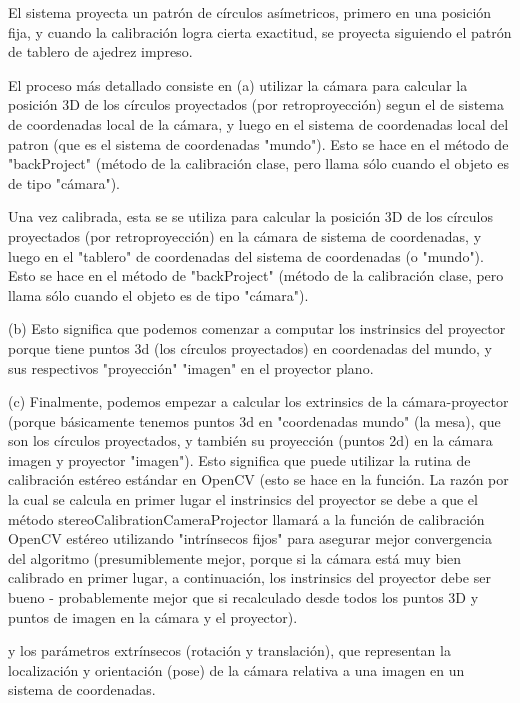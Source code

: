 El sistema proyecta un patrón de círculos asímetricos, primero en una posición fija, y cuando la calibración logra cierta exactitud, se proyecta siguiendo el patrón de tablero de ajedrez impreso. 

El proceso más detallado consiste en (a) utilizar la cámara para calcular la posición 3D de los círculos proyectados (por retroproyección) segun el  de sistema de coordenadas local de la cámara, y luego en el sistema de coordenadas local del patron (que es el sistema de coordenadas "mundo"). Esto se hace en el método de "backProject" (método de la calibración clase, pero llama sólo cuando el objeto es de tipo "cámara"). 

Una vez calibrada, esta se se utiliza para calcular la posición 3D de los círculos proyectados (por retroproyección) en la cámara de sistema de coordenadas, y luego en el "tablero" de coordenadas del sistema de coordenadas (o "mundo"). Esto se hace en el método de "backProject" (método de la calibración clase, pero llama sólo cuando el objeto es de tipo "cámara"). 

(b) Esto significa que podemos comenzar a computar los instrinsics del proyector porque tiene puntos 3d (los círculos proyectados) en coordenadas del mundo, y sus respectivos "proyección" "imagen" en el proyector plano. 

(c) Finalmente, podemos empezar a calcular los extrinsics de la cámara-proyector (porque básicamente tenemos puntos 3d en "coordenadas mundo" (la mesa), que son los círculos proyectados, y también su proyección (puntos 2d) en la cámara imagen y proyector "imagen"). Esto significa que puede utilizar la rutina de calibración estéreo estándar en OpenCV (esto se hace en la función. La razón por la cual se calcula en primer lugar el instrinsics del proyector se debe a que el método stereoCalibrationCameraProjector llamará a la función de calibración OpenCV estéreo utilizando "intrínsecos fijos" para asegurar mejor convergencia del algoritmo (presumiblemente mejor, porque si la cámara está muy bien calibrado en primer lugar, a continuación, los instrinsics del proyector debe ser bueno - probablemente mejor que si recalculado desde todos los puntos 3D y puntos de imagen en la cámara y el proyector). 


 y los parámetros extrínsecos (rotación y translación), que
representan la localización y orientación (pose) de la cámara relativa a una imagen en un sistema de coordenadas.


